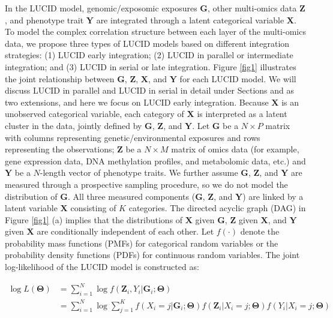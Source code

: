 In the LUCID model, genomic/exposomic exposures $\bm G$, other multi-omics data $\bm Z$, and phenotype trait $\bm Y$ are integrated through a latent categorical variable $\bm X$. To model the complex correlation structure between each layer of the multi-omics data, we propose three types of LUCID models based on different integration strategies: (1) LUCID early integration; (2) LUCID in parallel or intermediate integration; and (3) LUCID in serial or late integration. Figure \ref{fig1} illustrates the joint relationship between $\bm G$, $\bm Z$, $\bm X$, and $\bm Y$ for each LUCID model. We will discuss LUCID in parallel and LUCID in serial in detail under Sections  and  as two extensions, and here we focus on LUCID early integration. Because $\bm X$ is an unobserved categorical variable, each category of $\bm X$ is interpreted as a latent cluster in the data, jointly defined by $\bm G$, $\bm Z$, and $\bm Y$. Let $\bm G$ be a $N \times P$ matrix with columns representing genetic/environmental exposures and rows representing the observations; $\bm Z$ be a $N \times M$ matrix of omics data (for example, gene expression data, DNA methylation profiles, and metabolomic data, etc.) and $\bm Y$ be a $N$-length vector of phenotype traits. We further assume $\bm G$, $\bm Z$, and $\bm Y$ are measured through a prospective sampling procedure, so we do not model the distribution of $\bm G$. All three measured components ($\bm G$, $\bm Z$, and $\bm Y$) are linked by a latent variable $\bm X$ consisting of $K$ categories. The directed acyclic graph (DAG) in Figure \ref{fig1} (a) implies that the distributions of $\bm X$ given $\bm G$, $\bm Z$ given $\bm X$, and $\bm Y$ given $\bm X$ are conditionally independent of each other. Let $f(\cdot)$ denote the probability mass functions (PMFs) for categorical random variables or the probability density functions (PDFs) for continuous random variables. The joint log-likelihood of the LUCID model is constructed as:

\begin{equation}
    \begin{aligned}
         \log L(\bm{\Theta}) & = \sum_{i = 1}^N \log f(\bm{Z}_i, Y_i|\bm{G}_i;\bm{\Theta}) \\
         & = \sum_{i = 1}^N \log \sum_{j = 1}^K f(X_i = j| \bm{G}_i; \bm{\Theta}) f(\bm{Z}_i| X_i = j; \bm{\Theta}) f(Y_i|X_i = j; \bm{\Theta})
    \end{aligned}
    \label{eq1}
\end{equation}

